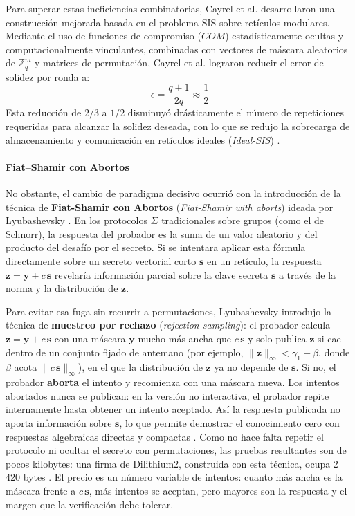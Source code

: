 Para superar estas ineficiencias combinatorias, Cayrel et al. \cite{cayrel2012improved} desarrollaron una construcción mejorada basada en el problema SIS sobre retículos modulares. Mediante el uso de funciones de compromiso ($COM$) estadísticamente ocultas y computacionalmente vinculantes, combinadas con vectores de máscara aleatorios de $\mathbb{Z}_q^{m}$ y matrices de permutación, Cayrel et al. lograron reducir el error de solidez por ronda a:
\begin{equation}
\epsilon = \frac{q+1}{2q} \approx \frac{1}{2}
\end{equation}
Esta reducción de $2/3$ a $1/2$ disminuyó drásticamente el número de repeticiones requeridas para alcanzar la solidez deseada, con lo que se redujo la sobrecarga de almacenamiento y comunicación en retículos ideales (\textit{Ideal-SIS}) \cite{cayrel2012improved}.

\paragraph{Fiat--Shamir con Abortos}
\label{sec:fiat-shamir-abortos}
No obstante, el cambio de paradigma decisivo ocurrió con la introducción de la técnica de \textbf{Fiat-Shamir con Abortos} (\textit{Fiat-Shamir with aborts}) ideada por Lyubashevsky \cite{lyubashevsky2009fiat, lyubashevsky2012lattice}. En los protocolos $\Sigma$ tradicionales sobre grupos (como el de Schnorr), la respuesta del probador es la suma de un valor aleatorio y del producto del desafío por el secreto. Si se intentara aplicar esta fórmula directamente sobre un secreto vectorial corto $\mathbf{s}$ en un retículo, la respuesta $\mathbf{z} = \mathbf{y} + c\,\mathbf{s}$ revelaría información parcial sobre la clave secreta $\mathbf{s}$ a través de la norma y la distribución de $\mathbf{z}$.

Para evitar esa fuga sin recurrir a permutaciones, Lyubashevsky introdujo la técnica de \textbf{muestreo por rechazo} (\textit{rejection sampling}): el probador calcula $\mathbf{z} = \mathbf{y} + c\,\mathbf{s}$ con una máscara $\mathbf{y}$ mucho más ancha que $c\,\mathbf{s}$ y solo publica $\mathbf{z}$ si cae dentro de un conjunto fijado de antemano (por ejemplo, $\|\mathbf{z}\|_\infty < \gamma_1 - \beta$, donde $\beta$ acota $\|c\,\mathbf{s}\|_\infty$), en el que la distribución de $\mathbf{z}$ ya no depende de $\mathbf{s}$. Si no, el probador \textbf{aborta} el intento y recomienza con una máscara nueva. Los intentos abortados nunca se publican: en la versión no interactiva, el probador repite internamente hasta obtener un intento aceptado. Así la respuesta publicada no aporta información sobre $\mathbf{s}$, lo que permite demostrar el conocimiento cero con respuestas algebraicas directas y compactas \cite{lyubashevsky2009fiat, lyubashevsky2012lattice}. Como no hace falta repetir el protocolo ni ocultar el secreto con permutaciones, las pruebas resultantes son de pocos kilobytes: una firma de Dilithium2, construida con esta técnica, ocupa 2\,420 bytes \cite{bai2021dilithium}. El precio es un número variable de intentos: cuanto más ancha es la máscara frente a $c\,\mathbf{s}$, más intentos se aceptan, pero mayores son la respuesta y el margen que la verificación debe tolerar.

